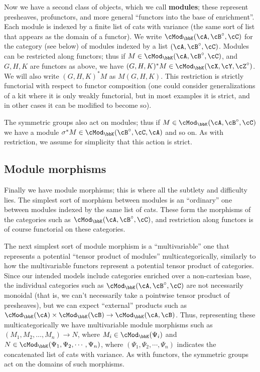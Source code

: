 \documentclass{amsart}
\newcommand{\A}{\cA}
\newcommand{\B}{\cB}
\newcommand{\C}{\cC}
\newcommand{\X}{\cX}
\newcommand{\Y}{\cY}
\newcommand{\Z}{\cZ}
\newcommand{\K}{\bbK}
\let\mod\cMod
\def\modk{\mod_\K}
\renewcommand{\o}{^{\circ}}
\begin{document}
Now we have a second class of objects, which we call \textbf{modules}; these represent presheaves, profunctors, and more general ``functors into the base of enrichment''.
Each module is indexed by a finite list of cats with variance (the same sort of list that appears as the domain of a functor).
We write $\modk(\A,\B\o,\C)$ for the category (see below) of modules indexed by a list $(\A,\B\o,\C)$.
Modules can be restricted along functors; thus if $M\in \modk(\A,\B\o,\C)$, and $G,H,K$ are functors as above, we have $(G,H,K)^*M \in \modk(\X,\Y,\Z\o)$.
We will also write $(G,H,K)^*M$ as $M(G,H,K)$.
This restriction is strictly functorial with respect to functor composition (one could consider generalizations of a kit where it is only weakly functorial, but in most examples it is strict, and in other cases it can be modified to become so).

The symmetric groups also act on modules; thus if $M\in \modk(\A,\B\o,\C)$ we have a module $\sigma^*M\in \modk(\B\o,\C,\A)$ and so on.
As with restriction, we assume for simplicity that this action is strict.

\subsection{Module morphisms}

Finally we have module morphisms; this is where all the subtlety and difficulty lies.
The simplest sort of morphism between modules is an ``ordinary'' one between modules indexed by the same list of cats.
These form the morphisms of the categories such as $\modk(\A,\B\o,\C)$, and restriction along functors is of course functorial on these categories.

The next simplest sort of module morphism is a ``multivariable'' one that represents a potential ``tensor product of modules'' multicategorically, similarly to how the multivariable functors represent a potential tensor product of categories.
Since our intended models include categories enriched over a non-cartesian base, the individual categories such as $\modk(\A,\B\o,\C)$ are not necessarily monoidal (that is, we can't necessarily take a pointwise tensor product of presheaves), but we can expect ``external'' products such as $\modk(\A) \times \modk(\B) \to \modk(\A,\B)$.
Thus, representing these multicategorically we have multivariable module morphisms such as $(M_1,M_2,\dots,M_n) \to N$, where $M_i\in \modk(\Psi_i)$ and $N\in\modk(\Psi_1,\Psi_2,\cdots,\Psi_n)$, where $(\Psi_1,\Psi_2,\cdots,\Psi_n)$ indicates the concatenated list of cats with variance.
As with functors, the symmetric groups act on the domains of such morphisms.
\end{document}
